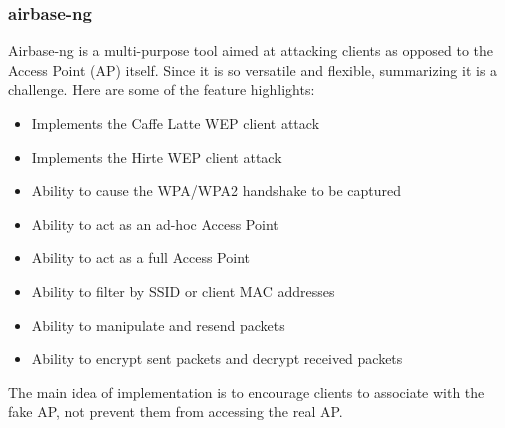 \documentclass{article}
\begin{document}
\subsubsection{airbase-ng}
Airbase-ng is a multi-purpose tool aimed at attacking clients as opposed to the Access Point (AP) itself. Since it is so versatile and flexible, summarizing it is a challenge. Here are some of the feature highlights:
\begin{itemize}
	\item Implements the Caffe Latte WEP client attack
	\item Implements the Hirte WEP client attack
	\item Ability to cause the WPA/WPA2 handshake to be captured
	\item Ability to act as an ad-hoc Access Point
	\item Ability to act as a full Access Point
	\item Ability to filter by SSID or client MAC addresses
	\item Ability to manipulate and resend packets
	\item Ability to encrypt sent packets and decrypt received packets
\end{itemize}
The main idea of implementation is to encourage clients to  associate  with  the fake AP, not prevent them from accessing the real AP.
\end{document}
